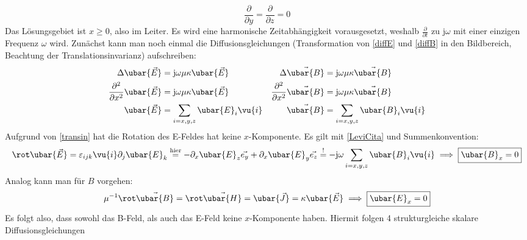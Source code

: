 		        \begin{equation}\label{transin}
			        \dfrac{\partial}{\partial y} = \dfrac{\partial}{\partial z} = 0
		        \end{equation}
		   Das Lösungsgebiet ist $x\geq0$, also im Leiter. Es wird eine harmonische Zeitabhängigkeit vorausgesetzt, weshalb $\frac{\partial}{\partial t}$ zu $\mathrm{j}\omega$ mit einer einzigen Frequenz $\omega$ wird. Zunächst kann man noch einmal die Diffusionsgleichungen (Transformation von \ref{diffE} und \ref{diffB} in den Bildbereich, Beachtung der Translationsinvarianz) aufschreiben:
	  \begin{align*}
		  \Delta \ubar{\vec{E}}                           & = \mathrm{j}\omega\mu\kappa \ubar{\vec{E}}  & \Delta \vec{\ubar{B}}                           & = \mathrm{j}\omega\mu \kappa \vec{\ubar{B}}  \\
		  \dfrac{\partial^2}{\partial x^2} \ubar{\vec{E}} & = \mathrm{j}\omega\mu \kappa \ubar{\vec{E}} & \dfrac{\partial^2}{\partial x^2} \vec{\ubar{B}} & = \mathrm{j}\omega \mu \kappa \vec{\ubar{B}} \\
		  \ubar{\vec{E}}                                  & = \sum_{i=x,y,z}\ubar{E}_i \vu{i}           & \vec{\ubar{B}}                                  & = \sum_{i=x,y,z}\ubar{B}_i \vu{i}
	  \end{align*}
			   Aufgrund von \ref{transin} hat die Rotation des E-Feldes hat keine $x$-Komponente. Es gilt mit \ref{LeviCita} und Summenkonvention:
			        \begin{equation}\begin{split}
					        \rot \ubar{\vec{E}} = \varepsilon_{ijk} \vu{i} \partial_j\ubar{E}_k \stackrel{\text{hier}}{=} -\partial_x\ubar{E}_z \vec{e_y} + \partial_x\ubar{E}_y \vec{e_z} \stackrel{!}{=} -\mathrm{j}\omega   \sum_{i=x,y,z}\ubar{B}_i \vu{i} \implies \boxed{\ubar{B}_x=0}
				        \end{split}\end{equation}
			   Analog kann man für $B$ vorgehen:
			        \begin{equation}\begin{split}
					        \mu^{-1} \rot \vec{\ubar{B}} = \rot \vec{\ubar{H}} = \ubar{\vec{J}} = \kappa\ubar{\vec{E}} \implies \boxed{\ubar{E}_x=0}
				        \end{split}\end{equation}
			        Es folgt also, dass sowohl das B-Feld, als auch das E-Feld keine $x$-Komponente haben. Hiermit folgen 4 strukturgleiche skalare Diffusionsgleichungen

